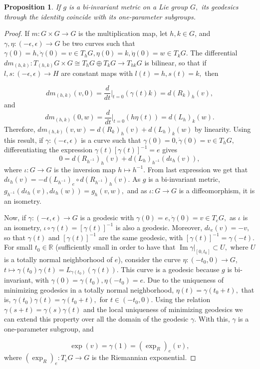 \documentclass[12pt, letterpaper, reqno]{amsart}
\theoremstyle{definition}
\theoremstyle{plain}
\newtheorem{prop}{Proposition}
\theoremstyle{remark}
\begin{document}
\begin{prop}\label{prop:essential_fact1}
	If $ g $ is a bi-invariant metric on a Lie group $ G, $ its geodesics through the identity coincide with its one-parameter subgroups.
\end{prop}
\begin{proof}
	If $ m: G\times G \rightarrow G $ is the multiplication map, let $ h,k\in G $, and $ \gamma,\eta: \left( -\epsilon,\epsilon \right) \rightarrow G $ be two curves such that $ \gamma(0)=h, \dot{\gamma}(0)=v \in T_hG,\eta(0)=k,\dot{\eta}(0)=w\in T_kG. $ The differential $ dm_{(h,k)}: T_{(h,k)}G\times G\cong T_hG\oplus T_kG \rightarrow T_{hk} G $ is bilinear, so that if $ l,s: \left( -\epsilon,\epsilon \right) \rightarrow H $ are constant maps with $ l(t)=h,s(t)=k, $ then

	$$ dm_{(h,k)}(v,0)= \frac{d}{dt} \Big|_{t=0} \left( \gamma(t) k \right) = d(R_k)_h(v), $$ 
	and
	$$ dm_{(h,k)}(0,w) = \frac{d}{dt} \Big|_{t=0}\left( h\eta(t) \right) = d(L_h)_k(w). $$ 
	Therefore, $ dm_{(h,k)}(v,w) = d(R_k)_h(v)+ d(L_h)_k(w)  $ by linearity.  Using this result, if $ \gamma: \left( -\epsilon,\epsilon \right)  $ is a curve such that $ \gamma(0)=0, \dot{\gamma}(0)=v\in T_hG, $ differentiating the expression $ \gamma(t) \left[ \gamma(t) \right]^{-1}=e $ gives
	$$ 0 = d(R_{h^{-1}})_h(v)+d(L_h)_{h^{-1}} \left( d\iota_h(v) \right),  $$ 
	where $ \iota: G \rightarrow G $ is the inversion map $ h \mapsto h^{-1}. $ From last expression we get that $ d\iota_h(v)=-d(L_{h^{-1}})_e\circ d(R_{h^{-1}})_h(v) $. As $ g $ is a bi-invariant metric, $ g_{h^{-1}}(d\iota_h(v),d\iota_h(w)) = g_h(v,w), $ and as $ \iota: G \rightarrow G $ is a diffeomorphism, it is an isometry. 

	Now, if $ \gamma: \left( -\epsilon,\epsilon \right) \rightarrow G $ is a geodesic with $ \gamma(0)=e,\dot{\gamma}(0)=v\in T_eG, $ as $ \iota $ is an isometry, $ \iota\circ\gamma(t)= \left[ \gamma(t) \right]^{-1} $ is also a geodesic. Moreover, $ d\iota_e(v)=-v, $ so that $ \gamma(t) $ and $ \left[ \gamma(t) \right]^{-1} $ are the same geodesic, with $ \left[ \gamma(t) \right]^{-1} = \gamma(-t).  $ For small $ t_0\in \mathbb{R} $ (sufficiently small in order to have that $ \operatorname{Im} \gamma|_{[0,t_0]}\subset U,  $ where $ U $ is a totally normal neighborhood of $ e $), consider the curve $ \eta:(-t_0,0) \rightarrow G $, $ t \mapsto  \gamma(t_0)\gamma(t)= L_{\gamma(t_0)}(\gamma(t)) $. This curve is a geodesic because $ g $ is bi-invariant, with $ \gamma(0)=\gamma(t_0), \eta(-t_0)=e. $ Due to the uniqueness of minimizing geodesics in a totally normal neighborhood, $ \eta(t)=\gamma(t_0+t), $ that is, $ \gamma(t_0)\gamma(t)= \gamma(t_0+t), $ for $ t\in (-t_0,0). $  Using the relation $ \gamma(s+t)=\gamma(s)\gamma(t) $  and the local uniqueness of minimizing geodesics we can extend this property over all the domain of the geodesic $ \gamma. $ With this, $ \gamma $ is a one-parameter subgroup, and

	$$ \operatorname{exp} (v)=\gamma(1)= (\operatorname{exp}_R)_e(v),  $$ 
	where $ (\operatorname{exp}_R)_e : T_eG \rightarrow G  $ is the Riemannian exponential.
\end{proof}
\end{document}
